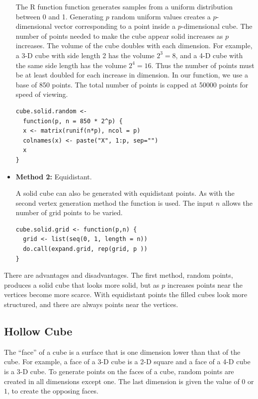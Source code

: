\documentclass[a4paper]{report}
\begin{document}
\begin{article}
\begin{itemize}
    The R function  function generates samples from a
    uniform distribution between 0 and 1. Generating $p$ random
    uniform values creates a $p$-dimensional vector corresponding to a
    point inside a $p$-dimensional cube. The number of points needed
    to make the cube appear solid increases as $p$ increases. The
    volume of the cube doubles with each dimension. For example, a 3-D
    cube with side length 2 has the volume $2^3=8$, and a 4-D cube
    with the same side length has the volume $2^4=16$. Thus the number
    of points must be at least doubled for each increase in
    dimension. In our function, we use a base of 850 points. The total
    number of points is capped at 50000 points for speed of viewing.

\begin{verbatim}
cube.solid.random <- 
  function(p, n = 850 * 2^p) {
  x <- matrix(runif(n*p), ncol = p)
  colnames(x) <- paste("X", 1:p, sep="")
  x
}
\end{verbatim}

  \item {\bf Method 2:} Equidistant.
  
    A solid cube can also be generated with equidistant points. As
    with the second vertex generation method the 
    function is used. The input $n$ allows the number of grid points
    to be varied.

\begin{verbatim}
cube.solid.grid <- function(p,n) {
  grid <- list(seq(0, 1, length = n))
  do.call(expand.grid, rep(grid, p ))
}
\end{verbatim}
\end{itemize}

There are advantages and disadvantages.  The first method, random
points, produces a solid cube that looks more solid, but as $p$
increases points near the vertices become more scarce.  With
equidistant points the filled cubes look more structured, and there
are always points near the vertices.

\subsection{Hollow Cube}

The ``face'' of a cube is a surface that is one dimension lower than
that of the cube.  For example, a face of a 3-D cube is a 2-D square
and a face of a 4-D cube is a 3-D cube. To generate points on the
faces of a cube, random points are created in all dimensions except
one. The last dimension is given the value of $0$ or $1$, to create
the opposing faces.


\end{article}
\end{document}
